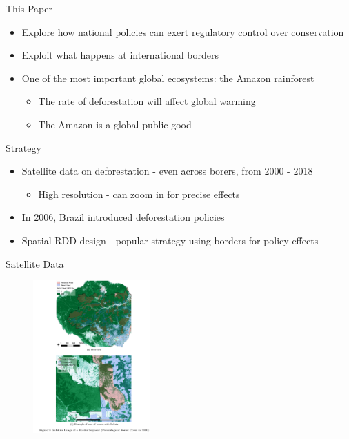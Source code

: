 \documentclass[11pt,notes=hide,aspectratio=169,mathserif]{beamer}
\begin{document}
\begin{frame}{This Paper}
\begin{itemize}
\item Explore how national policies can exert regulatory control over conservation 
\item Exploit what happens at international borders 
\item One of the most important global ecosystems: the Amazon rainforest
\begin{itemize}
    \item The rate of deforestation will affect global warming
    \item The Amazon is a global public good
\end{itemize}
\end{itemize}
\end{frame}

\begin{frame}{Strategy}
\begin{itemize}
\item Satellite data on deforestation - even across borers, from 2000 - 2018 
\begin{itemize}
\item High resolution - can zoom in for precise effects 
\end{itemize}
\item In 2006, Brazil introduced deforestation policies
\item Spatial RDD design - popular strategy using borders for policy effects
\end{itemize}
\end{frame}

\begin{frame}{Satellite Data}
\begin{figure}
\centering
\includegraphics[width=0.4\textwidth]{../TA9/inputs/fig2.2.png}
\end{figure}
\end{frame}
\end{document}
